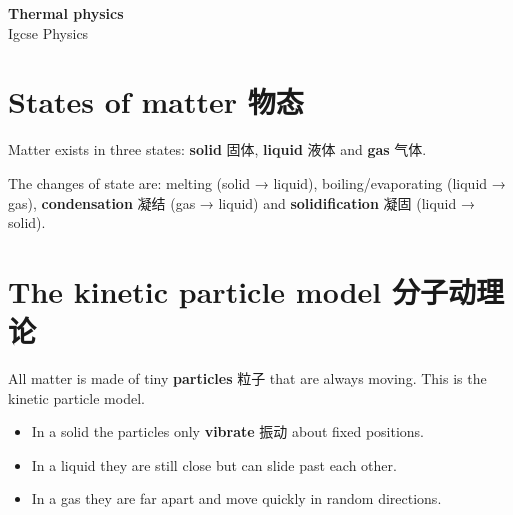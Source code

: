 \documentclass[11pt]{article}
\begin{document}
\begin{center}
  {\LARGE\bfseries Thermal physics}\\[0.35em]
  {\large Igcse Physics}
\end{center}
\vspace{0.6em}

\section*{States of matter 物态}

Matter exists in three states: \textbf{solid} 固体, \textbf{liquid} 液体 and \textbf{gas} 气体.

\begin{center}
\end{center}

The changes of state are: melting (solid → liquid), boiling/evaporating (liquid → gas), \textbf{condensation} 凝结 (gas → liquid) and \textbf{solidification} 凝固 (liquid → solid).

\section*{The kinetic particle model 分子动理论}

All matter is made of tiny \textbf{particles} 粒子 that are always moving. This is the kinetic particle model.

\begin{itemize}
\item In a solid the particles only \textbf{vibrate} 振动 about fixed positions.

\item In a liquid they are still close but can slide past each other.

\item In a gas they are far apart and move quickly in random directions.

\end{itemize}
\end{document}
